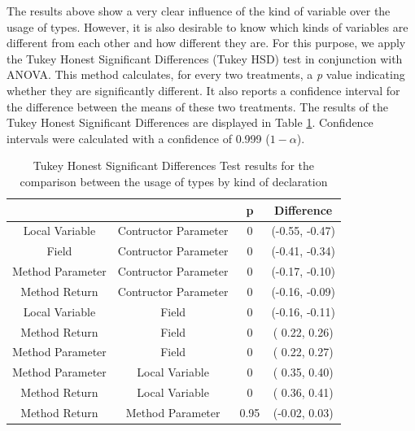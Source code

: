 \documentclass[msc]{ppgccufmg}
\renewcommand{\arraystretch}{1.2}
\begin{document}
The results above show a very clear influence of the kind of variable over the usage of types.
However, it is also desirable to know which kinds of variables are different from each other and how different they are.
For this purpose, we apply the Tukey Honest Significant Differences (Tukey HSD) test in conjunction with ANOVA.
This method calculates, for every two treatments, a \emph{p} value indicating whether they are significantly different.
It also reports a confidence interval for the difference between the means of these two treatments.
The results of the Tukey Honest Significant Differences are displayed in Table \ref{tab:all_utest_type}.
Confidence intervals were calculated with a confidence of 0.999 ($1-\alpha$).



\begin{table}[ht]

\centering{}%
\renewcommand{\arraystretch}{1.2}

\begin{tabular}{|c|c|c|c|}
\hline 
								& {}					& p  	      & Difference \\
\hline
\hline
Local Variable & Contructor Parameter & 0      & (-0.55, -0.47) \\ \hline
Field & Contructor Parameter & 0      & (-0.41, -0.34) \\ \hline
Method Parameter & Contructor Parameter & 0      & (-0.17, -0.10) \\ \hline
Method Return & Contructor Parameter & 0      & (-0.16, -0.09) \\ \hline
Local Variable & Field & 0      & (-0.16, -0.11) \\ \hline
Method Return & Field & 0      & ( 0.22,  0.26) \\ \hline
Method Parameter & Field & 0      & ( 0.22,  0.27) \\ \hline
Method Parameter& Local Variable & 0      & ( 0.35,  0.40) \\ \hline
Method Return & Local Variable & 0      & ( 0.36,  0.41) \\ \hline
Method Return & Method Parameter& 0.95 & (-0.02,  0.03) \\ \hline
\end{tabular}
\caption{Tukey Honest Significant Differences Test results for the comparison between the usage of types by kind of declaration}
\label{tab:all_utest_type}
\end{table}
\end{document}
